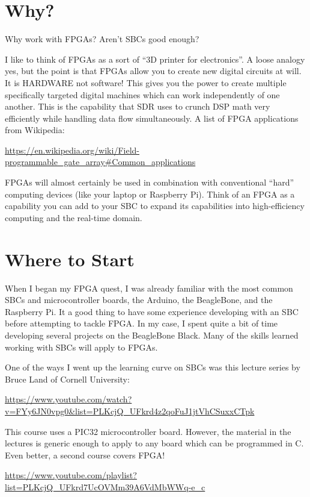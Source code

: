 \section{Why?}

Why work with FPGAs?  Aren't SBCs good enough?

I like to think of FPGAs as a sort of ``3D printer for electronics''.  A loose analogy yes, but the point is that FPGAs allow you to create new digital circuits at will.  It is HARDWARE not software!  This gives you the power to create multiple specifically targeted digital machines which can work independently of one another.  This is the capability that SDR uses to crunch DSP math very efficiently while handling data flow simultaneously.  A list of FPGA applications from Wikipedia:

\url{https://en.wikipedia.org/wiki/Field-programmable_gate_array#Common_applications}

FPGAs will almost certainly be used in combination with conventional ``hard'' computing devices (like your laptop or Raspberry Pi).  Think of an FPGA as a capability you can add to your SBC to expand its capabilities into high-efficiency computing and the real-time domain.

\section{Where to Start}

When I began my FPGA quest, I was already familiar with the most common SBCs and microcontroller boards, the Arduino, the BeagleBone, and the Raspberry Pi.
It a good thing to have some experience developing with an SBC before attempting to tackle FPGA.  In my case, I spent quite a bit of time developing several projects on the BeagleBone Black.  Many of the skills learned working with SBCs will apply to FPGAs.

One of the ways I went up the learning curve on SBCs was this lecture series by Bruce Land of Cornell University:

\url{https://www.youtube.com/watch?v=FYy6JN0vpg0&list=PLKcjQ_UFkrd4z2qoFuJ1jtVhCSuxxCTpk}

This course uses a PIC32 microcontroller board.  However, the material in the lectures is generic enough to apply to any board which can be programmed in C.
Even better, a second course covers FPGA!

\url{https://www.youtube.com/playlist?list=PLKcjQ_UFkrd7UcOVMm39A6VdMbWWq-e_c}

